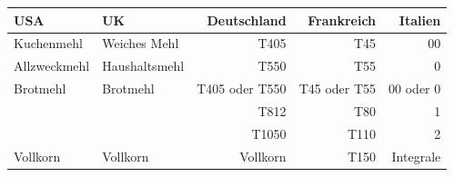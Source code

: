 \begin{tabular}{@{}llrrr@{}}
\toprule
\textbf{USA}  & \textbf{UK}  & {\textbf{Deutschland}} & {\textbf{Frankreich}} & {\textbf{Italien}} \\ \midrule
Kuchenmehl         & Weiches Mehl  &  T405            &  T45        & 00 \\
Allzweckmehl  & Haushaltsmehl &  T550            &  T55        & 0 \\
Brotmehl  & Brotmehl &  T405 oder T550    &  T45 oder T55 & 00 oder 0 \\
             &             &  T812            &  T80        & 1 \\
             &             &  T1050           &  T110       & 2 \\
Vollkorn        & Vollkorn       &  Vollkorn        &  T150       & Integrale \\ \bottomrule
\end{tabular}
